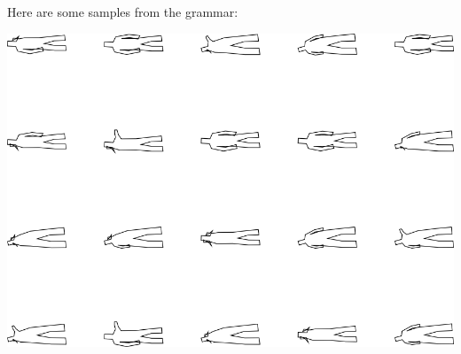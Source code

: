 Here are some samples from the grammar:

\includegraphics[width=6in]{output/3.learning/incremental/gram.4.d/samples.png}

